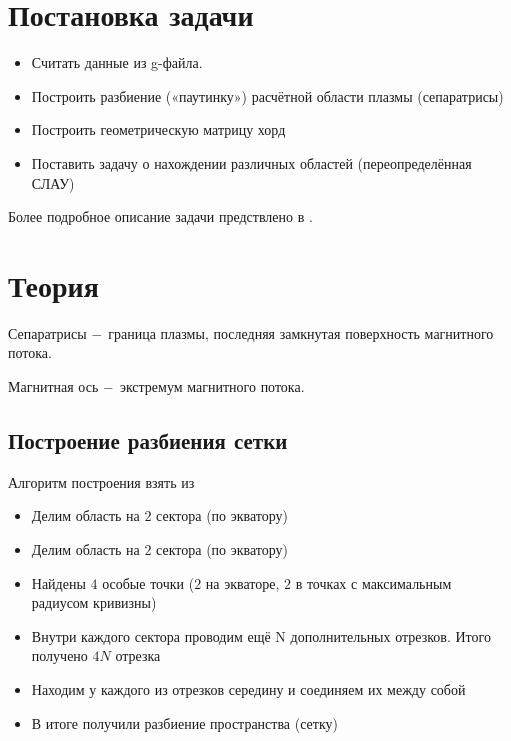 \documentclass[a4]{article}
\renewcommand{\listoffigures}{\begingroup %
\tocsection
\tocfile{\listfigurename}{lof}
\endgroup}
\begin{document}
\newpage
\pagestyle{plain}



\newpage
\tableofcontents{}
\newpage
\listoffigures{}
\newpage

\section{Постановка задачи}
\begin{itemize}
\item Считать данные из g-файла.

\item Построить разбиение («паутинку») расчётной области плазмы (сепаратрисы)

\item Построить геометрическую матрицу хорд

\item Поставить задачу о нахождении различных областей (переопределённая СЛАУ)

\end{itemize}

Более подробное описание задачи предствлено в \cite{source}.

\section{Теория}
Сепаратрисы $\--$ граница плазмы, последняя замкнутая поверхность магнитного потока.

Магнитная ось $\--$ экстремум магнитного потока.

\subsection{Построение разбиения сетки}
Алгоритм построения взять из \cite{source}
\begin{itemize}
    \item Делим область на $2$ сектора (по экватору)
    \item Делим область на $2$ сектора (по экватору)
    \item Найдены $4$ особые точки ($2$ на экваторе, $2$ в точках с максимальным радиусом кривизны)
    \item Внутри каждого сектора проводим ещё N дополнительных отрезков. Итого получено $4N$ отрезка
    \item Находим у каждого из отрезков середину и соединяем их между собой
    \item В итоге получили разбиение пространства (сетку)
\end{itemize}
\end{document}
